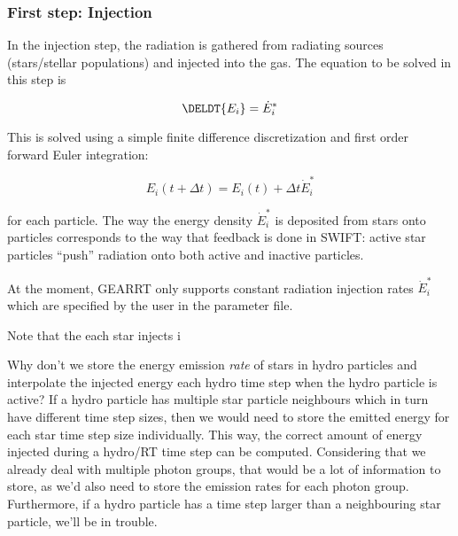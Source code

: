 \subsubsection{First step: Injection} \label{chap:injection-step}


In the injection step, the radiation is gathered from radiating sources 
(stars/stellar populations) and injected into the gas.
The equation to be solved in this step is

\begin{equation}
		\DELDT{E_i} = \dot{E}_i^* \label{eq:solve-dEdt}
\end{equation}


This is solved using a simple finite difference discretization and first order
forward Euler integration:

\begin{equation}
    E_i(t + \Delta t) = E_i(t) + \Delta t \dot{E}_i^* 
\end{equation}

for each particle. The way the energy density $\dot{E}_i^*$ is deposited from 
stars onto particles corresponds to the way that feedback is done in SWIFT:
active star particles ``push'' radiation onto both active and inactive particles.

At the moment, GEARRT only supports constant radiation injection rates $\dot{E}_i^*$
which are specified by the user in the parameter file.


Note that the each star injects i

Why don't we store the energy emission \emph{rate} of stars in hydro particles and interpolate the
injected energy each hydro time step when the hydro particle is active? If a hydro particle has
multiple star particle neighbours which in turn have different time step sizes, then we would need
to store the emitted energy for each star time step size individually. This way, the correct amount
of energy injected during a hydro/RT time step can be computed. Considering that we already deal
with multiple photon groups, that would be a lot of information to store, as we'd also need to
store the emission rates for each photon group. Furthermore, if a hydro particle has a time step
larger than a neighbouring star particle, we'll be in trouble.



